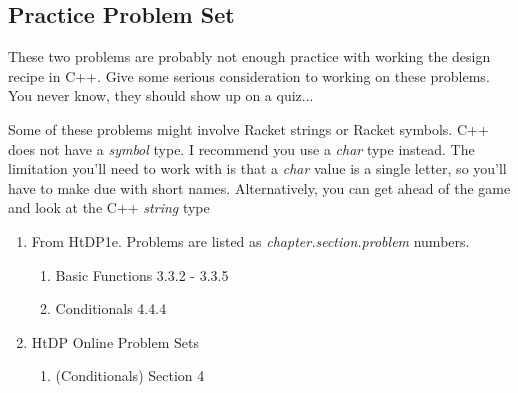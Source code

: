 \documentclass[]{tufte-handout}
\begin{document}
\newpage

\subsection{Practice Problem Set}

These two problems are probably not enough practice with working the design recipe in C++.  Give some serious consideration to working on these problems. You never know, they should show up on a quiz...

Some of these problems might involve Racket strings or Racket symbols. C++ does not have a \textit{symbol} type.  I recommend you use a \textit{char} type instead.  The limitation you'll need to work with is that a \textit{char} value is a single letter, so you'll have to make due with short names.  Alternatively, you can get ahead of the game and look at the C++ \textit{string} type
\begin{enumerate}
\item From HtDP1e. Problems are listed as \textit{chapter.section.problem} numbers.
\begin{enumerate}
\item Basic Functions 3.3.2 - 3.3.5
\item Conditionals 4.4.4
\end{enumerate}
\item HtDP Online Problem Sets
\begin{enumerate}
\item (Conditionals) Section 4
\end{enumerate}
\end{enumerate}
\end{document}
